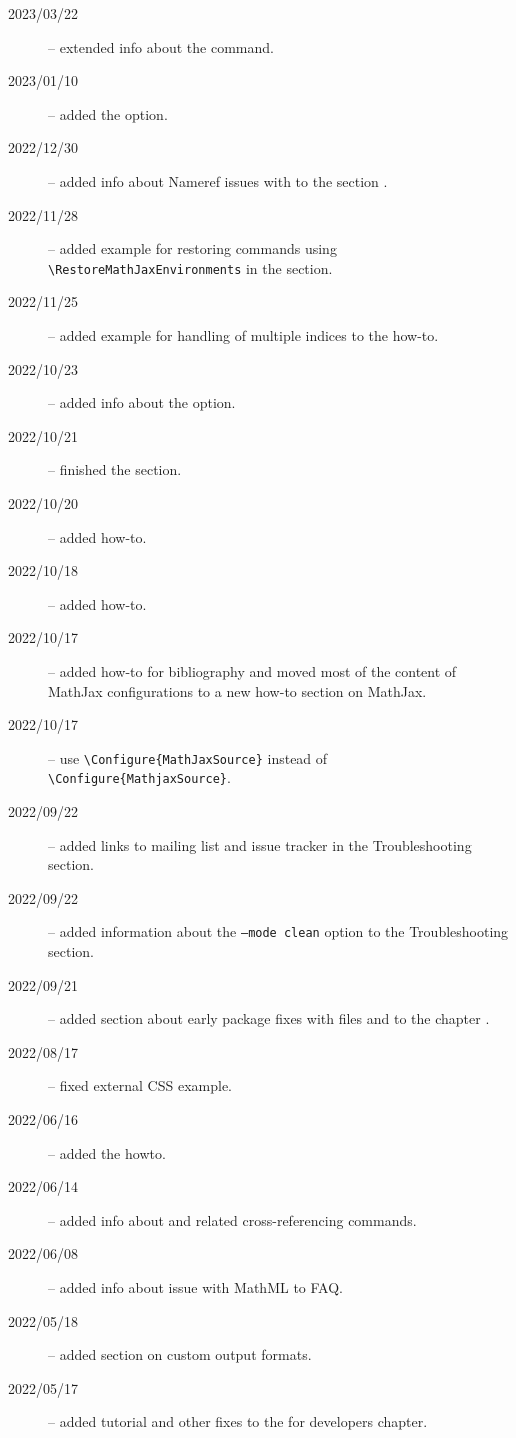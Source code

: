 
\begin{description}
  \item[2023/03/22] -- extended info about the  command.
  \item[2023/01/10] -- added the  option.
  \item[2022/12/30] -- added info about Nameref issues with  to the section .
  \item[2022/11/28] -- added example for restoring commands using \verb|\RestoreMathJaxEnvironments| in the  section.
  \item[2022/11/25] -- added example for handling of multiple indices to the  how-to.
  \item[2022/10/23] -- added info about the  option.
  \item[2022/10/21] -- finished the  section.
  \item[2022/10/20] -- added  how-to.
  \item[2022/10/18] -- added  how-to.
  \item[2022/10/17] -- added how-to for bibliography and moved most of the content of MathJax configurations to a new how-to section on MathJax. 
  \item[2022/10/17] -- use \verb|\Configure{MathJaxSource}| instead of \verb|\Configure{MathjaxSource}|.
  \item[2022/09/22] -- added links to mailing list and issue tracker in the Troubleshooting section.
  \item[2022/09/22] -- added information about the \texttt{--mode clean} option to the Troubleshooting section.
  \item[2022/09/21] -- added section about early package fixes with  files and  to the chapter .
  \item[2022/08/17] -- fixed external CSS example.
  \item[2022/06/16] -- added the  howto.
  \item[2022/06/14] -- added info about  and related cross-referencing commands.
  \item[2022/06/08] -- added info about  issue with MathML to FAQ.
  \item[2022/05/18] -- added section on custom output formats.
  \item[2022/05/17] -- added tutorial and other fixes to the for developers chapter.

\end{description}
